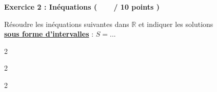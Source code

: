 \documentclass[12pt,a4paper]{exam}
\begin{document}
\vspace{0.5cm}

\noindent
\textbf{Exercice 2 : Inéquations (\ \ \ \  / 10 points )}
\vspace{5pt}

\begin{questions}

\question[4] Résoudre les inéquations suivantes dans $\mathbb{R}$ et indiquer les solutions 
\\\textbf{\underline{sous forme d'intervalles}} : $S = ...$
\begin{multicols}{2}
\end{multicols}
\begin{multicols}{2}
\end{multicols}
\begin{multicols}{2}
\end{multicols}


\end{questions}
\end{document}
